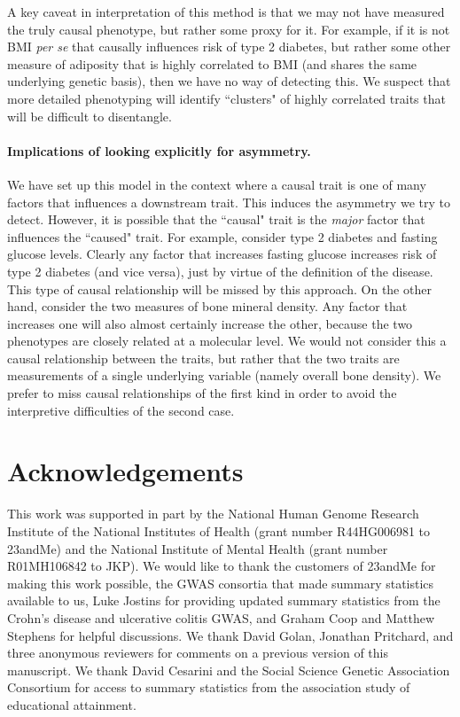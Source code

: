 \documentclass[11pt,titlepage]{article}
\begin{document}
A key caveat in interpretation of this method is that we may not have measured the truly causal phenotype, but rather some proxy for it. For example, if it is not BMI \emph{per se} that causally influences risk of type 2 diabetes, but rather some other measure of adiposity that is highly correlated to BMI (and shares the same underlying genetic basis), then we have no way of detecting this. We suspect that more detailed phenotyping will identify ``clusters" of highly correlated traits that will be difficult to disentangle.  

\paragraph{Implications of looking explicitly for asymmetry.}

We have set up this model in the context where a causal trait is one of many factors that influences a downstream trait. This induces the asymmetry we try to detect. However, it is possible that the ``causal" trait is the \emph{major} factor that influences the ``caused" trait. For example, consider type 2 diabetes and fasting glucose levels. Clearly any factor that increases fasting glucose increases risk of type 2 diabetes (and vice versa), just by virtue of the definition of the disease. This type of causal relationship will be missed by this approach. On the other hand, consider the two measures of bone mineral density. Any factor that increases one will also almost certainly increase the other, because the two phenotypes are closely related at a molecular level. We would not consider this a causal relationship between the traits, but rather that the two traits are measurements of a single underlying variable (namely overall bone density). We prefer to miss causal relationships of the first kind in order to avoid the interpretive difficulties of the second case.
\section{Acknowledgements}
This work was supported in part by the National Human Genome Research Institute of the National Institutes of Health (grant number R44HG006981 to 23andMe) and the National Institute of Mental Health (grant number R01MH106842 to JKP). We would like to thank the customers of 23andMe for making this work possible, the GWAS consortia that made summary statistics available to us, Luke Jostins for providing updated summary statistics from the Crohn's disease and ulcerative colitis GWAS, and Graham Coop and Matthew Stephens for helpful discussions. We thank David Golan, Jonathan Pritchard, and three anonymous reviewers for comments on a previous version of this manuscript. We thank David Cesarini and the Social Science Genetic Association Consortium for access to summary statistics from the association study of educational attainment.
\end{document}
